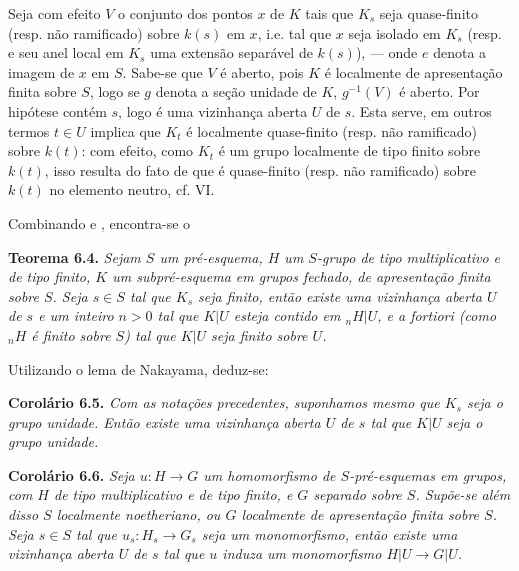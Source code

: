 Seja com efeito \(V\) o conjunto dos pontos \(x\) de
\(K\) tais que \(K_s\) seja quase-finito (resp. não
ramificado) sobre \(k(s)\) em \(x\), i.e. tal que \(x\)
seja isolado em \(K_s\) (resp. e seu anel local em \(K_s\)
uma extensão separável de \(k(s)\)), --- onde \(e\) denota
a imagem de \(x\) em \(S\). Sabe-se que \(V\) é aberto,
pois \(K\) é localmente de apresentação finita sobre \(S\),
logo se \(g\) denota a seção unidade de \(K\), \(g^{-1}(V)\)
é aberto. Por hipótese contém \(s\), logo é uma vizinhança
aberta \(U\) de \(s\). Esta serve, em outros termos \(t\in U\)
implica que \(K_t\) é localmente quase-finito (resp. não
ramificado) sobre \(k(t)\): com efeito, como \(K_t\) é um
grupo localmente de tipo finito sobre
\(k(t)\), isso resulta do fato de que é quase-finito
(resp. não ramificado) sobre \(k(t)\) no elemento neutro,
cf. VI.

Combinando  e
, encontra-se o

\medskip
\noindent{}\textbf{Teorema 6.4.}
\textit{Sejam \(S\) um pré-esquema, \(H\) um \(S\)-grupo
de tipo multiplicativo e de tipo finito, \(K\) um
subpré-esquema em grupos fechado, de apresentação finita
sobre \(S\). Seja \(s\in S\) tal que \(K_s\) seja finito,
então existe uma vizinhança aberta \(U\) de \(s\) e um
inteiro \(n>0\) tal que \(K|U\) esteja contido em
\({}_nH|U\), e a fortiori (como \({}_nH\) é finito sobre
\(S\)) tal que \(K|U\) seja finito sobre \(U\).}

Utilizando o lema de Nakayama, deduz-se:

\medskip
\noindent{}\textbf{Corolário 6.5.}
\textit{Com as notações precedentes, suponhamos mesmo que
\(K_s\) seja o grupo unidade. Então existe uma vizinhança
aberta \(U\) de \(s\) tal que \(K|U\) seja o grupo unidade.}

\medskip
\noindent{}\textbf{Corolário 6.6.}
\textit{Seja \(u:H\to G\) um homomorfismo de
\(S\)-pré-esquemas em grupos, com \(H\) de tipo
multiplicativo e de tipo finito, e \(G\) separado sobre
\(S\). Supõe-se além disso \(S\) localmente noetheriano,
ou \(G\) localmente de apresentação finita sobre \(S\).
Seja \(s\in S\) tal que \(u_s:H_s\to G_s\) seja um
monomorfismo, então existe uma vizinhança aberta \(U\) de
\(s\) tal que \(u\) induza um monomorfismo \(H|U\to G|U\).}

